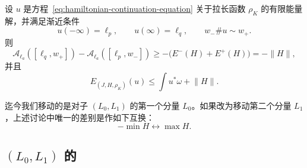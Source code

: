 \begin{proposition}
\label{prop:concatenated-continuation-bounds}
设 $u$ 是方程~\eqref{eq:hamiltonian-continuation-equation} 关于拉长函数
$\rho_K$ 的有限能量解，并满足渐近条件
\[
  u(-\infty)=\ell_p,
  \qquad
  u(\infty)=\ell_q,
  \qquad
  w_-\#u\sim w_+.
\]
则
\begin{equation}
  \mathcal A_{\ell_a}([\ell_q,w_+])
  -
  \mathcal A_{\ell_a}([\ell_p,w_-])
  \geq
  -\bigl(E^-(H)+E^+(H)\bigr)
  =
  -\lVert H\rVert,
\label{eq:concatenated-continuation-level-bound}
\end{equation}
并且
\begin{equation}
  E_{(J,H,\rho_K)}(u)
  \leq
  \int u^*\omega
  +
  \lVert H\rVert.
\label{eq:concatenated-continuation-energy-bound}
\end{equation}
\end{proposition}

迄今我们移动的是对子 $(L_0,L_1)$ 的第一个分量 $L_0$。如果改为移动第二个分量
$L_1$，上述讨论中唯一的差别是作如下互换：
\[
  -\min H
  \longleftrightarrow
  \max H.
\]

\subsection{\texorpdfstring{$(L_0,L_1)$ 的\termSimultaneousHamiltonianIsotopy{}}
{(L0,L1) 的同时哈密顿同痕}}
\label{subsec:simultaneous-hamiltonian-isotopy}

